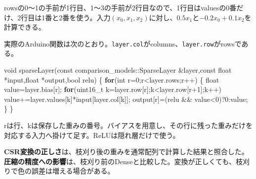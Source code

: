 \documentclass[
  11pt,
  a4paper,
]{article}
\newenvironment{Shaded}{}{}
\newcommand{\AttributeTok}[1]{\textcolor[rgb]{0.49,0.56,0.16}{#1}}
\newcommand{\ControlFlowTok}[1]{\textcolor[rgb]{0.00,0.44,0.13}{\textbf{#1}}}
\newcommand{\DataTypeTok}[1]{\textcolor[rgb]{0.56,0.13,0.00}{#1}}
\newcommand{\DecValTok}[1]{\textcolor[rgb]{0.25,0.63,0.44}{#1}}
\newcommand{\NormalTok}[1]{#1}
\newcommand{\OperatorTok}[1]{\textcolor[rgb]{0.40,0.40,0.40}{#1}}
\begin{document}
rowsの0〜1の手前が1行目、1〜3の手前が2行目なので、1行目はvaluesの0番だけ、2行目は1番と2番を使う。入力\((x_0,x_1,x_2)\)に対し、\(0.5x_1\)と\(-0.2x_0+0.1x_2\)を計算できる。

実際のArduino関数は次のとおり。\texttt{layer.col}がcolumns、\texttt{layer.row}がrowsである。

\begin{Shaded}
\begin{Highlighting}[]
\DataTypeTok{void}\NormalTok{ sparseLayer}\OperatorTok{(}\AttributeTok{const}\NormalTok{ comparison\_models}\OperatorTok{::}\NormalTok{SparseLayer }\OperatorTok{\&}\NormalTok{layer}\OperatorTok{,}\AttributeTok{const} \DataTypeTok{float} \OperatorTok{*}\NormalTok{input}\OperatorTok{,}\DataTypeTok{float} \OperatorTok{*}\NormalTok{output}\OperatorTok{,}\DataTypeTok{bool}\NormalTok{ relu}\OperatorTok{)} \OperatorTok{\{}
  \ControlFlowTok{for}\OperatorTok{(}\DataTypeTok{int}\NormalTok{ r}\OperatorTok{=}\DecValTok{0}\OperatorTok{;}\NormalTok{r}\OperatorTok{\textless{}}\NormalTok{layer}\OperatorTok{.}\NormalTok{rows}\OperatorTok{;}\NormalTok{r}\OperatorTok{++)} \OperatorTok{\{}
    \DataTypeTok{float}\NormalTok{ value}\OperatorTok{=}\NormalTok{layer}\OperatorTok{.}\NormalTok{bias}\OperatorTok{[}\NormalTok{r}\OperatorTok{];}
    \ControlFlowTok{for}\OperatorTok{(}\DataTypeTok{uint16\_t}\NormalTok{ k}\OperatorTok{=}\NormalTok{layer}\OperatorTok{.}\NormalTok{row}\OperatorTok{[}\NormalTok{r}\OperatorTok{];}\NormalTok{k}\OperatorTok{\textless{}}\NormalTok{layer}\OperatorTok{.}\NormalTok{row}\OperatorTok{[}\NormalTok{r}\OperatorTok{+}\DecValTok{1}\OperatorTok{];}\NormalTok{k}\OperatorTok{++)}\NormalTok{ value}\OperatorTok{+=}\NormalTok{layer}\OperatorTok{.}\NormalTok{values}\OperatorTok{[}\NormalTok{k}\OperatorTok{]*}\NormalTok{input}\OperatorTok{[}\NormalTok{layer}\OperatorTok{.}\NormalTok{col}\OperatorTok{[}\NormalTok{k}\OperatorTok{]];}
\NormalTok{    output}\OperatorTok{[}\NormalTok{r}\OperatorTok{]=(}\NormalTok{relu }\OperatorTok{\&\&}\NormalTok{ value}\OperatorTok{\textless{}}\DecValTok{0}\OperatorTok{)?}\DecValTok{0}\OperatorTok{:}\NormalTok{value}\OperatorTok{;}
  \OperatorTok{\}}
\OperatorTok{\}}
\end{Highlighting}
\end{Shaded}

rは行、kは保存した重みの番号。バイアスを用意し、その行に残った重みだけを対応する入力へ掛けて足す。ReLUは隠れ層だけで使う。

\textbf{CSR変換の正しさ}は、枝刈り後の重みを通常配列で計算した結果と照合した。\textbf{圧縮の精度への影響}は、枝刈り前のDenseと比較した。変換が正しくても、枝刈りで色の誤差は増える場合がある。
\end{document}

